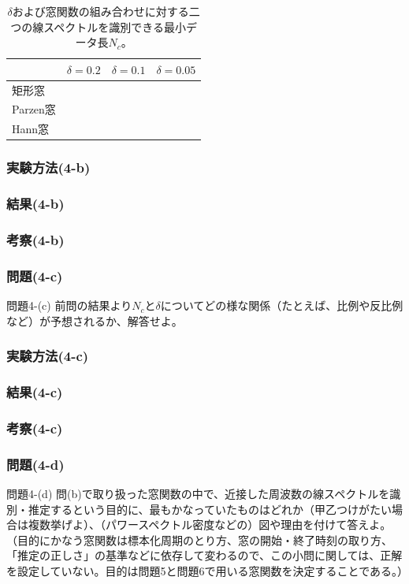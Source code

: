 \documentclass[a4j]{jarticle}
\begin{document}
\begin{table}[htbp]
  \centering
  \caption{$\delta$および窓関数の組み合わせに対する二つの線スペクトルを識別できる最小データ長$N_c$。}
  \label{tab:frequency-resolution}
  \begin{tabular}{|l|c|c|c|}
    \hline
     & $\delta=0.2$ & $\delta=0.1$ & $\delta=0.05$ \\
    \hline
    矩形窓 & & & \\
    \hline
    Parzen窓 & & & \\
    \hline
    Hann窓 & & & \\
    \hline
  \end{tabular}
\end{table}

\subsubsection{実験方法(4-b)}

\subsubsection{結果(4-b)}

\subsubsection{考察(4-b)}

\subsubsection{問題(4-c)}
\begin{itembox}[l]{問題4-(c)}
前問の結果より$N_c$と$\delta$についてどの様な関係（たとえば、比例や反比例など）が予想されるか、解答せよ。
\end{itembox}

\subsubsection{実験方法(4-c)}

\subsubsection{結果(4-c)}

\subsubsection{考察(4-c)}

\subsubsection{問題(4-d)}
\begin{itembox}[l]{問題4-(d)}
問(b)で取り扱った窓関数の中で、近接した周波数の線スペクトルを識別・推定するという目的に、最もかなっていたものはどれか（甲乙つけがたい場合は複数挙げよ）、（パワースペクトル密度などの）図や理由を付けて答えよ。（目的にかなう窓関数は標本化周期のとり方、窓の開始・終了時刻の取り方、「推定の正しさ」の基準などに依存して変わるので、この小問に関しては、正解を設定していない。目的は問題5と問題6で用いる窓関数を決定することである。）
\end{itembox}
\end{document}
